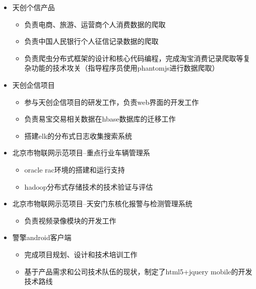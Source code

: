 \begin{itemize}
  \item 天创个信产品
  \begin{itemize}
    \item 负责电商、旅游、运营商个人消费数据的爬取
    \item 负责中国人民银行个人征信记录数据的爬取
    \item 负责爬虫分布式框架的设计和核心代码编程，完成淘宝消费记录爬取等复杂功能的技术攻关（指导程序员使用phantomjs进行数据爬取）
  \end{itemize}
  \item 天创企信项目
  \begin{itemize}
    \item 参与天创企信项目的研发工作，负责web界面的开发工作
    \item 负责易宝交易相关数据在hbase数据库的迁移工作
    \item 搭建elk的分布式日志收集搜索系统
  \end{itemize}
\end{itemize}

\begin{itemize}
  \item 北京市物联网示范项目--重点行业车辆管理系
  \begin{itemize}
    \item oracle rac环境的搭建和运行支持
    \item hadoop分布式存储技术的技术验证与评估
  \end{itemize}
  \item 北京市物联网示范项目--天安门东核化报警与检测管理系统
  \begin{itemize}
    \item 负责视频录像模块的开发工作
  \end{itemize}
  \item 警擎android客户端
  \begin{itemize}
    \item 完成项目规划、设计和技术培训工作
    \item 基于产品需求和公司技术队伍的现状，制定了html5+jquery mobile的开发技术路线
  \end{itemize}
\end{itemize}

